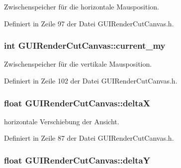 Zwischenspeicher für die horizontale Mausposition. 



Definiert in Zeile 97 der Datei G\-U\-I\-Render\-Cut\-Canvas.\-h.

\hypertarget{classGUIRenderCutCanvas_a349deb05f26285eaf8207cbe45bf6603}{
\subsubsection[{current\-\_\-my}]{\setlength{\rightskip}{0pt plus 5cm}int G\-U\-I\-Render\-Cut\-Canvas\-::current\-\_\-my\hspace{0.3cm}{\ttfamily [private]}}}\label{classGUIRenderCutCanvas_a349deb05f26285eaf8207cbe45bf6603}


Zwischenspeicher für die vertikale Mausposition. 



Definiert in Zeile 102 der Datei G\-U\-I\-Render\-Cut\-Canvas.\-h.

\hypertarget{classGUIRenderCutCanvas_a28357900ca23a3d3519af015ed6333ba}{
\subsubsection[{delta\-X}]{\setlength{\rightskip}{0pt plus 5cm}float G\-U\-I\-Render\-Cut\-Canvas\-::delta\-X\hspace{0.3cm}{\ttfamily [private]}}}\label{classGUIRenderCutCanvas_a28357900ca23a3d3519af015ed6333ba}


horizontale Verschiebung der Ansicht. 



Definiert in Zeile 87 der Datei G\-U\-I\-Render\-Cut\-Canvas.\-h.

\hypertarget{classGUIRenderCutCanvas_a17b630c38009368a99e37b9f0eab3deb}{
\subsubsection[{delta\-Y}]{\setlength{\rightskip}{0pt plus 5cm}float G\-U\-I\-Render\-Cut\-Canvas\-::delta\-Y\hspace{0.3cm}{\ttfamily [private]}}}\label{classGUIRenderCutCanvas_a17b630c38009368a99e37b9f0eab3deb}


